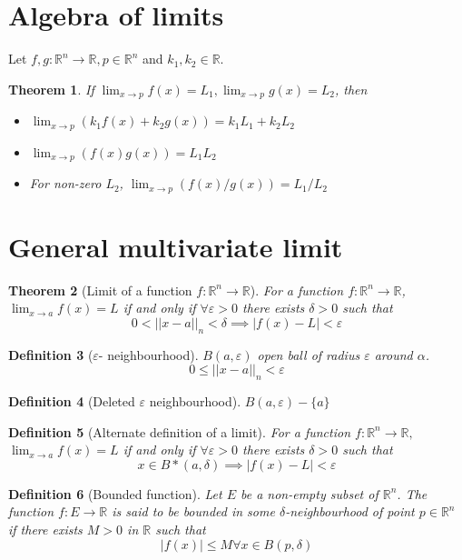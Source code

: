 \documentclass[oneside,11pt,pdftex]{book}%
\numberwithin{equation}{section}
\newtheorem{theorem}{Theorem}[chapter]%
\newtheorem{definition}[theorem]{Definition}
\numberwithin{section}{chapter}
\numberwithin{equation}{chapter}
\newcommand{\R}{\mathbb{R}}
\begin{document}
\section{Algebra of limits}
Let $ f,g: \R^n \rightarrow \R, p \in \R^n $ and $ k_1,k_2 \in \R $.
\begin{theorem}
	If $ \lim_{x \rightarrow p} f(x)=L_1, \lim_{x\rightarrow p}g(x)=L_2 $, then
	\begin{itemize}
		\item $\displaystyle \lim_{x \rightarrow p} (k_1 f(x)+k_2 g(x))=k_1 L_1+k_2 L_2 $
		\item $\displaystyle \lim_{x \rightarrow p} (f(x)g(x))=L_1 L_2 $
		\item For non-zero $ L_2 $, $\displaystyle \lim_{x \rightarrow p} (f(x)/g(x))=L_1/L_2 $
	\end{itemize}
\end{theorem}

\section{General multivariate limit}
\begin{theorem}[Limit of a function $ f: \R^n \rightarrow \R $]
	For a function $ f:\R^n \rightarrow \R  $, $ \lim_{x\rightarrow a}f(x)=L $ if and only if $ \forall \varepsilon >0 $ there exists $ \delta>0 $ such that
	\[ 0<||x-a||_n<\delta \implies |f(x)-L|<\varepsilon \]
\end{theorem}

\begin{definition}[$ \varepsilon $- neighbourhood]
	$ B(a,\varepsilon) $ open ball of radius $ \varepsilon $ around $ \alpha $.
	\[ 0 \leq ||x-a||_n < \varepsilon \]
\end{definition}
\begin{definition}[Deleted $ \varepsilon $ neighbourhood]
	$ B(a,\varepsilon)-\{a\} $
\end{definition}

\begin{definition}[Alternate definition of a limit]
	For a function $ f:\R^n \rightarrow \R,$ $ \lim_{x\rightarrow a }f(x)=L$ if and only if $ \forall \varepsilon>0 $ there exists $ \delta>0 $ such that \[ x \in B*(a,\delta)\implies |f(x)-L|<\varepsilon \]
\end{definition}

\begin{definition}[Bounded function]
	Let $ E $ be a non-empty subset of $ \R^n $. The function $ f:E\rightarrow \R  $ is said to be bounded in some $ \delta  $-neighbourhood of point $ p\in \R^n $ if there exists $ M>0 $ in $ \R  $ such that \[ |f(x)| \leq M \forall x \in B(p, \delta) \]
\end{definition}
\end{document}
